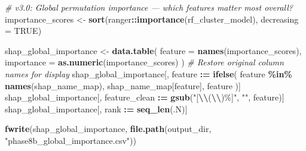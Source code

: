 \documentclass[
]{article}
\newenvironment{Shaded}{\begin{snugshade}}{\end{snugshade}}
\newcommand{\AttributeTok}[1]{\textcolor[rgb]{0.13,0.29,0.53}{#1}}
\newcommand{\CommentTok}[1]{\textcolor[rgb]{0.56,0.35,0.01}{\textit{#1}}}
\newcommand{\ConstantTok}[1]{\textcolor[rgb]{0.56,0.35,0.01}{#1}}
\newcommand{\FunctionTok}[1]{\textcolor[rgb]{0.13,0.29,0.53}{\textbf{#1}}}
\newcommand{\NormalTok}[1]{#1}
\newcommand{\OtherTok}[1]{\textcolor[rgb]{0.56,0.35,0.01}{#1}}
\newcommand{\SpecialCharTok}[1]{\textcolor[rgb]{0.81,0.36,0.00}{\textbf{#1}}}
\newcommand{\StringTok}[1]{\textcolor[rgb]{0.31,0.60,0.02}{#1}}
\begin{document}
\begin{Shaded}
\begin{Highlighting}[]
\CommentTok{\# v3.0: Global permutation importance — which features matter most overall?}
\NormalTok{importance\_scores }\OtherTok{\textless{}{-}} \FunctionTok{sort}\NormalTok{(ranger}\SpecialCharTok{::}\FunctionTok{importance}\NormalTok{(rf\_cluster\_model), }\AttributeTok{decreasing =} \ConstantTok{TRUE}\NormalTok{)}

\NormalTok{shap\_global\_importance }\OtherTok{\textless{}{-}} \FunctionTok{data.table}\NormalTok{(}
  \AttributeTok{feature =} \FunctionTok{names}\NormalTok{(importance\_scores),}
  \AttributeTok{importance =} \FunctionTok{as.numeric}\NormalTok{(importance\_scores)}
\NormalTok{)}
\CommentTok{\# Restore original column names for display}
\NormalTok{shap\_global\_importance[, feature }\SpecialCharTok{:=} \FunctionTok{ifelse}\NormalTok{(}
\NormalTok{  feature }\SpecialCharTok{\%in\%} \FunctionTok{names}\NormalTok{(shap\_name\_map),}
\NormalTok{  shap\_name\_map[feature],}
\NormalTok{  feature}
\NormalTok{)]}
\NormalTok{shap\_global\_importance[, feature\_clean }\SpecialCharTok{:=} \FunctionTok{gsub}\NormalTok{(}\StringTok{"[}\SpecialCharTok{\textbackslash{}\textbackslash{}}\StringTok{(}\SpecialCharTok{\textbackslash{}\textbackslash{}}\StringTok{)\%]"}\NormalTok{, }\StringTok{""}\NormalTok{, feature)]}
\NormalTok{shap\_global\_importance[, rank }\SpecialCharTok{:=} \FunctionTok{seq\_len}\NormalTok{(.N)]}

\FunctionTok{fwrite}\NormalTok{(shap\_global\_importance, }\FunctionTok{file.path}\NormalTok{(output\_dir, }\StringTok{"phase8b\_global\_importance.csv"}\NormalTok{))}


\end{Highlighting}
\end{Shaded}
\end{document}
